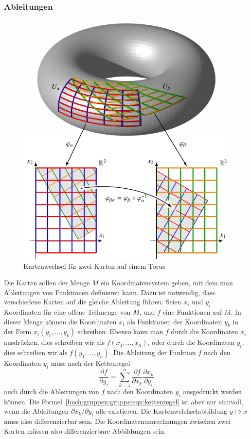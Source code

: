 %
%
\subsubsection{Ableitungen}
\begin{figure}
\centering
\includegraphics{chapters/030-gruppen/images/karten.pdf}
\caption{Kartenwechsel für zwei Karten auf einem Torus
\label{buch:gruppen:gruppe:fig:kartenwechsel}}
\end{figure}
Die Karten sollen der Menge $M$ ein Koordinatensystem geben, mit dem
man Ableitungen von Funktionen definieren kann.
Dazu ist notwendig, dass verschiedene Karten auf die gleiche
Ableitung führen.
Seien $x_i$ und $y_i$ Koordinaten für eine offene Teilmenge von $M$,
und $f$ eine Funktionen auf $M$.
In dieser Menge können die Koordinaten $x_i$ als Funktionen der 
Koordinaten $y_k$ in der Form $x_i(y_1,\dots,y_k)$ schreiben.
Ebenso kann man $f$ durch die Koordinaten $x_i$ ausdrücken, dies
schreiben wir als $f(x_1,\dots,x_n)$, oder durch die Koordinaten $y_i$,
dies schreiben wir als $f(y_1,\dots,y_n)$.
Die Ableitung der Funktion $f$ nach den Koordinaten $y_i$ muss nach
der Kettenregel
\begin{equation}
\frac{\partial f}{\partial y_i}
=
\sum_{k=1}^n
\frac{\partial f}{\partial x_k} \frac{\partial x_k}{\partial y_i}
\label{buch:gruppen:gruppe:eqn:kettenregel}
\end{equation}
auch durch die Ableitungen von $f$ nach den Koordinaten $y_i$
ausgedrückt werden können.
Die Formel~\ref{buch:gruppen:gruppe:eqn:kettenregel} ist aber nur sinnvoll,
wenn die Ableitungen $\partial x_k/\partial y_i$ alle existieren.
Die Kartenwelchselabbildung $y\mapsto x$ muss also differenzierbar sein.
Die Koordinatenumrechnungen zwischen zwei Karten müssen also differenzierbare
Abbildungen sein.

